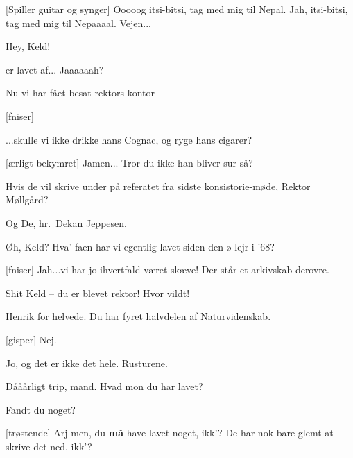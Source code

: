 \documentclass[a4paper,12pt]{article}
\begin{document}
\begin{sketch}


[Spiller guitar og synger] 
Ooooog itsi-bitsi, tag med mig til Nepal.
Jah, itsi-bitsi, tag med mig til Nepaaaal.
Vejen...

 Hey, Keld!

 er lavet af... Jaaaaaah?

 Nu vi har fået besat rektors kontor 

[fniser]

 ...skulle vi ikke drikke hans Cognac, og ryge hans cigarer?

[ærligt bekymret] Jamen... Tror du ikke han bliver sur så?


 Hvis de vil skrive under på referatet fra sidste
konsistorie-møde, Rektor Møllgård?


 Og De, hr.\ Dekan Jeppesen.


 Øh, Keld? Hva' faen har vi egentlig lavet siden
den ø-lejr i '68?

[fniser] Jah...vi har jo ihvertfald været skæve!
Der står et arkivskab derovre.


 Shit Keld -- du er blevet rektor! Hvor vildt!


 Henrik for helvede. Du har fyret halvdelen af
Naturvidenskab.

[gisper] Nej.

 Jo, og det er ikke det hele. 
Rusturene.


 Dååårligt trip, mand. Hvad mon du har lavet?


 Fandt du noget?

[trøstende] Arj men, du {\bf må} have lavet noget, ikk'?  De
har nok bare glemt at skrive det ned, ikk'?


\end{sketch}
\end{document}
